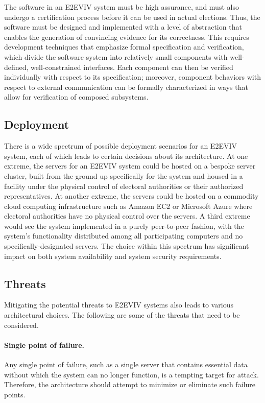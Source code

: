 The software in an E2EVIV system must be high assurance, and must also
undergo a certification process before it can be used in actual
elections. Thus, the software must be designed and implemented with a
level of abstraction that enables the generation of convincing
evidence for its correctness. This requires development techniques
that emphasize formal specification and verification, which divide the
software system into relatively small components with well-defined,
well-constrained interfaces. Each component can then be verified
individually with respect to its specification; moreover, component
behaviors with respect to external communication can be formally
characterized in ways that allow for verification of composed
subsystems.


\subsection{Deployment}

There is a wide spectrum of possible deployment scenarios for an
E2EVIV system, each of which leads to certain decisions about its
architecture. At one extreme, the servers for an E2EVIV system could
be hosted on a bespoke server cluster, built from the ground up
specifically for the system and housed in a facility under the
physical control of electoral authorities or their authorized
representatives. At another extreme, the servers could be hosted on a
commodity cloud computing infrastructure such as Amazon EC2 or
Microsoft Azure where electoral authorities have no physical control
over the servers. A third extreme would see the system implemented in
a purely peer-to-peer fashion, with the system's functionality
distributed among all participating computers and no
specifically-designated servers. The choice within this spectrum has
significant impact on both system availability and system security
requirements.


\subsection{Threats}

Mitigating the potential threats to E2EVIV systems also leads to
various architectural choices. The following are some of the threats
that need to be considered. 

\paragraph{Single point of failure.} Any single point of failure, such
as a single server that contains essential data without which the
system can no longer function, is a tempting target for
attack. Therefore, the architecture should attempt to minimize or
eliminate such failure points.

